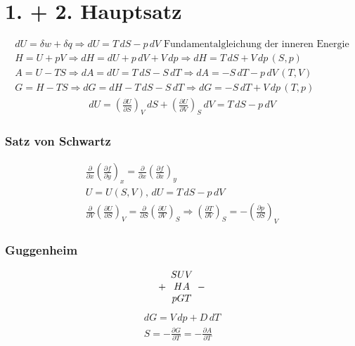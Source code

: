 \documentclass[a4paper, fleqn]{article}
\begin{document}
\section{1. + 2. Hauptsatz}
\begin{eqnarray*}
    dU = \delta w + \delta q \Rightarrow dU = T\,dS-p\,dV \text{ Fundamentalgleichung der inneren Energie}\\
    H=U+pV\Rightarrow dH=dU+p\,dV+V\,dp\Rightarrow dH=T\,dS+V\,dp\,(S,p)\\
    A=U-TS\Rightarrow dA=dU=T\,dS-S\,dT\Rightarrow dA=-S\,dT-p\,dV\,(T,V)\\
    G=H-TS\Rightarrow dG=dH-T\,dS-S\,dT\Rightarrow dG=-S\,dT+V\,dp\,(T,p)
\end{eqnarray*}
\begin{eqnarray*}
    dU=\left(\frac{\partial U}{\partial S}\right)_V\,dS+\left(\frac{\partial U}{\partial V}\right)_S\,dV = T\,dS-p\,dV
\end{eqnarray*}
\subsubsection{Satz von Schwartz}
\begin{eqnarray*}
    \frac{\partial}{\partial x}\left(\frac{\partial f}{\partial y}\right)_x = \frac{\partial}{\partial x}\left(\frac{\partial f}{\partial x}\right)_y\\
    U = U(S,V),\, dU=T\,dS-p\,dV\\
    \frac{\partial}{\partial V}\left(\frac{\partial U}{\partial S}\right)_V = \frac{\partial}{\partial S}\left(\frac{\partial U}{\partial V}\right)_S \Rightarrow \left(\frac{\partial T}{\partial V}\right)_S = -\left(\frac{\partial p}{\partial S}\right)_V
\end{eqnarray*}

\subsubsection{Guggenheim}
\begin{equation*}
    +\begin{array}{c c c}
        S U V\\
        H  A\\
        p G T\\
    \end{array}-
\end{equation*}
\begin{eqnarray*}
    dG = V\,dp+D\,dT\\
    S = -\frac{\partial G}{\partial T} = - \frac{\partial A}{\partial T}
\end{eqnarray*}
\end{document}
